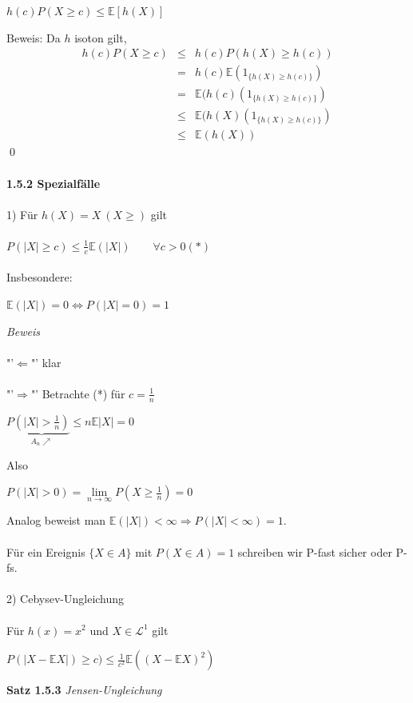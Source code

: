 \documentclass[10pt,a4paper]{report}
\numberwithin{equation}{section}
\numberwithin{figure}{section}
\theoremstyle{plain}
\theoremstyle{definition}
\theoremstyle{plain}
\theoremstyle{definition}
\theoremstyle{remark}
\theoremstyle{plain}
\begin{document}
\begin{center}
$h(c)P(X\geq c) \leq \mathbb{E}[h(X)]$
\end{center}
Beweis:	Da $h$ isoton gilt,
\begin{eqnarray*}
h(c)P(X\geq c) &\leq & h(c)P(h(X)\geq h(c))\\
&=& h(c) \mathbb{E}(1_{\{h(X)\geq h(c)\}})\\
&=& \mathbb{E}(h(c)(1_{\{h(X)\geq h(c)\}})\\
&\leq &\mathbb{E}(h(X)(1_{\{h(X)\geq h(c)\}})\\
&\leq &\mathbb{E}(h(X))
\end{eqnarray*}\qed\\\\
\textbf{1.5.2 Spezialfälle}\\\\
1) Für $h(X)=X ~(X\geq)$ gilt\\\\
$P(|X|\geq c) \leq \frac{1}{c}\mathbb{E}(|X|) \qquad \forall c >0 (*)$\\\\
Insbesondere:
\begin{center}
$\mathbb{E}(|X|)=0 \Leftrightarrow P(|X|=0)=1 $
\end{center}
\textit{Beweis}\\\\
"'$\Leftarrow$"' klar\\\\
"'$\Rightarrow$"' Betrachte (*) für $c=\frac{1}{n}$
\begin{center}
$P\underbrace{\left(|X|>\frac{1}{n}\right)}_{A_n\nearrow} \leq n\mathbb{E}|X|=0$
\end{center}
Also
\begin{center}
$P(|X|>0)=\lim\limits_{n \to \infty}P\left(X\geq \frac{1}{n}\right)=0$
\end{center}
Analog beweist man $\mathbb{E}(|X|)<\infty \Rightarrow P(|X|<\infty)=1$.\\\\
Für ein Ereignis $\{X\in A\}$ mit $P(X \in A)=1$ schreiben wir P-fast sicher oder P-fs.\\\\
2) Cebysev-Ungleichung\\\\
Für $h(x)=x^2$ und $X \in \mathcal{L}^1$ gilt 
\begin{center}
$P(|X-\mathbb{E}X|)\geq c) \leq \frac{1}{c^2}\mathbb{E}((X-\mathbb{E}X)^2)$
\end{center}
\textbf{Satz 1.5.3} \textit{Jensen-Ungleichung}\\\\
\end{document}
